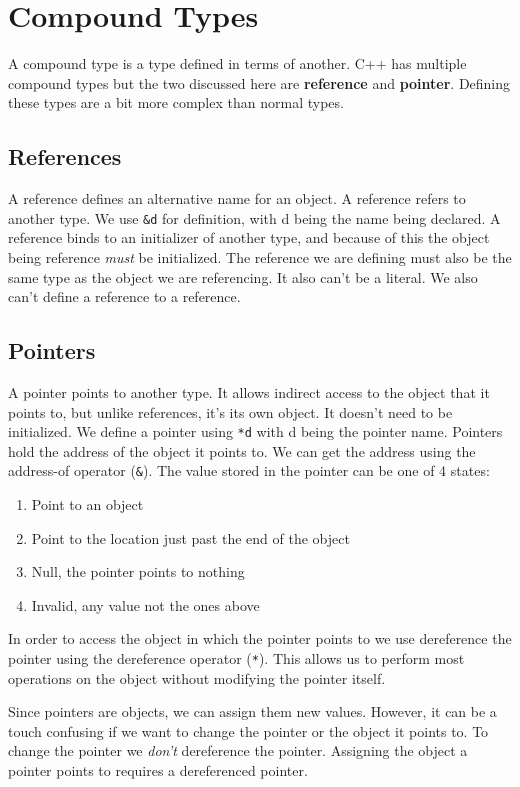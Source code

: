 \documentclass[12pt, a4paper]{report}
\begin{document}
\section{Compound Types}
A compound type is a type defined in terms of another. C++ has multiple compound types but the two discussed here are \textbf{reference} and \textbf{pointer}. Defining these types are a bit more complex than normal types.
\subsection{References}
A reference defines an alternative name for an object. A reference refers to another type. We use \verb|&d| for definition, with d being the name being declared. A reference binds to an initializer of another type, and because of this the object being reference \emph{must} be initialized. The reference we are defining must also be the same type as the object we are referencing. It also can't be a literal. We also can't define a reference to a reference.
\subsection{Pointers}
A pointer points to another type. It allows indirect access to the object that it points to, but unlike references, it's its own object.
It doesn't need to be initialized. We define a pointer using \verb|*d| with d being the pointer name. 
Pointers hold the address of the object it points to. We can get the address using the address-of operator (\verb|&|). The value stored in the pointer can be one of 4 states:
\begin{center}
	\begin{enumerate}
		\item Point to an object
		\item Point to the location just past the end of the object
		\item Null, the pointer points to nothing
		\item Invalid, any value not the ones above
	\end{enumerate}
\end{center}
In order to access the object in which the pointer points to we use dereference the pointer using the dereference operator (\verb|*|). This allows us to perform most operations on the object without modifying the pointer itself.

\noindent Since pointers are objects, we can assign them new values. However, it can be a touch confusing if we want to change the pointer or the object it points to. To change the pointer we \emph{don't} dereference the pointer. Assigning the object a pointer points to requires a dereferenced pointer.
\end{document}
